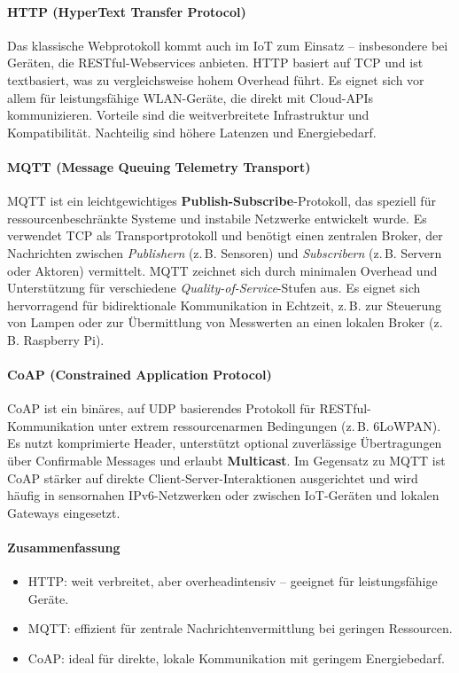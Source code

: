 \paragraph{HTTP (HyperText Transfer Protocol)} 
Das klassische Webprotokoll kommt auch im IoT zum Einsatz – insbesondere bei Geräten, die RESTful-Webservices anbieten. HTTP basiert auf TCP und ist textbasiert, was zu vergleichsweise hohem Overhead führt. Es eignet sich vor allem für leistungsfähige WLAN-Geräte, die direkt mit Cloud-APIs kommunizieren. Vorteile sind die weitverbreitete Infrastruktur und Kompatibilität. Nachteilig sind höhere Latenzen und Energiebedarf. \autocite{IoT_http}
\\
\paragraph{MQTT (Message Queuing Telemetry Transport)} 
MQTT ist ein leichtgewichtiges \textbf{Publish-Subscribe}-Protokoll, das speziell für ressourcenbeschränkte Systeme und instabile Netzwerke entwickelt wurde. Es verwendet TCP als Transportprotokoll und benötigt einen zentralen Broker, der Nachrichten zwischen \emph{Publishern} (z.\,B. Sensoren) und \emph{Subscribern} (z.\,B. Servern oder Aktoren) vermittelt. MQTT zeichnet sich durch minimalen Overhead und Unterstützung für verschiedene \emph{Quality-of-Service}-Stufen aus. Es eignet sich hervorragend für bidirektionale Kommunikation in Echtzeit, z.\,B. zur Steuerung von Lampen oder zur Übermittlung von Messwerten an einen lokalen Broker (z.\,B. Raspberry Pi). \autocite{IoT_mqtt}
\\
\paragraph{CoAP (Constrained Application Protocol)} 
CoAP ist ein binäres, auf UDP basierendes Protokoll für RESTful-Kommunikation unter extrem ressourcenarmen Bedingungen (z.\,B. 6LoWPAN). Es nutzt komprimierte Header, unterstützt optional zuverlässige Übertragungen über Confirmable Messages und erlaubt \textbf{Multicast}. Im Gegensatz zu MQTT ist CoAP stärker auf direkte Client-Server-Interaktionen ausgerichtet und wird häufig in sensornahen IPv6-Netzwerken oder zwischen IoT-Geräten und lokalen Gateways eingesetzt. \autocite{IoT_mqtt}
\\
\paragraph{Zusammenfassung} 
\begin{itemize}[noitemsep]
  \item HTTP: weit verbreitet, aber overheadintensiv – geeignet für leistungsfähige Geräte.
  \item MQTT: effizient für zentrale Nachrichtenvermittlung bei geringen Ressourcen.
  \item CoAP: ideal für direkte, lokale Kommunikation mit geringem Energiebedarf.
\end{itemize}

